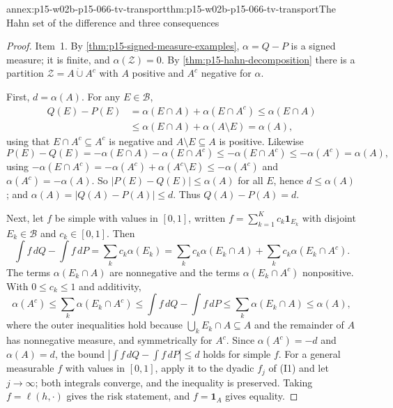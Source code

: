 \begin{annexitem}{annex:p15-w02b-p15-066-tv-transport}{thm:p15-w02b-p15-066-tv-transport}{The Hahn set of the difference and three consequences}
\begin{proof}
Item~1. By \cref{thm:p15-signed-measure-examples},
\(\alpha=Q-P\) is a signed measure; it is finite, and
\(\alpha(\mathcal Z)=0\). By \cref{thm:p15-hahn-decomposition} there is a
partition \(\mathcal Z=A\mathbin{\dot\cup}A^c\) with \(A\) positive and
\(A^c\) negative for \(\alpha\).

First, \(d=\alpha(A)\). For any \(E\in\mathcal B\),
\[
 \begin{aligned}
 Q(E)-P(E)&=\alpha(E\cap A)+\alpha(E\cap A^c)\leq\alpha(E\cap A)\\
 &\leq\alpha(E\cap A)+\alpha(A\setminus E)=\alpha(A),
 \end{aligned}
\]
using that \(E\cap A^c\subseteq A^c\) is negative and
\(A\setminus E\subseteq A\) is positive. Likewise
\[
 P(E)-Q(E)=-\alpha(E\cap A)-\alpha(E\cap A^c)\leq-\alpha(E\cap A^c)
 \leq-\alpha(A^c)=\alpha(A),
\]
using \(-\alpha(E\cap A^c)=-\alpha(A^c)+\alpha(A^c\setminus E)\leq-\alpha(A^c)\)
and \(\alpha(A^c)=-\alpha(A)\). So \(|P(E)-Q(E)|\leq\alpha(A)\) for all
\(E\), hence \(d\leq\alpha(A)\); and \(\alpha(A)=|Q(A)-P(A)|\leq d\).
Thus \(Q(A)-P(A)=d\).

Next, let \(f\) be simple with values in \([0,1]\), written
\(f=\sum_{k=1}^Kc_k\mathbf1_{E_k}\) with disjoint \(E_k\in\mathcal B\) and
\(c_k\in[0,1]\). Then
\[
 \int f\,dQ-\int f\,dP=\sum_kc_k\alpha(E_k)
 =\sum_kc_k\alpha(E_k\cap A)+\sum_kc_k\alpha(E_k\cap A^c).
\]
The terms \(\alpha(E_k\cap A)\) are nonnegative and the terms
\(\alpha(E_k\cap A^c)\) nonpositive. With \(0\leq c_k\leq1\) and
additivity,
\[
 \alpha(A^c)\leq\sum_k\alpha(E_k\cap A^c)
 \leq\int f\,dQ-\int f\,dP
 \leq\sum_k\alpha(E_k\cap A)\leq\alpha(A),
\]
where the outer inequalities hold because
\(\bigcup_kE_k\cap A\subseteq A\) and the remainder of \(A\) has
nonnegative measure, and symmetrically for \(A^c\). Since
\(\alpha(A^c)=-d\) and \(\alpha(A)=d\), the bound
\(|\int f\,dQ-\int f\,dP|\leq d\) holds for simple \(f\). For a general
measurable \(f\) with values in \([0,1]\), apply it to the dyadic
\(f_j\) of (I1) and let \(j\to\infty\); both integrals converge, and the
inequality is preserved. Taking \(f=\ell(h,\cdot)\) gives the risk
statement, and \(f=\mathbf1_A\) gives equality.


\end{proof}
\end{annexitem}
